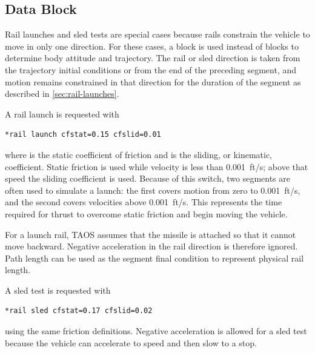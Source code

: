 \subsection{ Data Block}\label{sec:block-rail}

Rail launches and sled tests are special cases because rails constrain the vehicle to
move in only one direction. For these cases, a  block is used
instead of  blocks to determine body attitude and trajectory.
The rail or sled direction is taken from the trajectory initial conditions or from the
end of the preceding segment, and motion remains constrained in that direction for
the duration of the segment as described in \cref{sec:rail-launches}.

A rail launch is requested with

\begin{lstlisting}[style=taosmanual]
*rail launch cfstat=0.15 cfslid=0.01
\end{lstlisting}

where  is the static coefficient of friction and
 is the sliding, or kinematic, coefficient. Static friction is used
while velocity is less than 0.001~ft/s; above that speed the sliding coefficient is
used. Because of this switch, two segments are often used to simulate a launch: the
first covers motion from zero to 0.001~ft/s, and the second covers velocities above
0.001~ft/s. This represents the time required for thrust to overcome static friction
and begin moving the vehicle.

For a launch rail, TAOS assumes that the missile is attached so that it cannot move
backward. Negative acceleration in the rail direction is therefore ignored. Path length
 can be used as the segment final condition to represent physical
rail length.

A sled test is requested with

\begin{lstlisting}[style=taosmanual]
*rail sled cfstat=0.17 cfslid=0.02
\end{lstlisting}

using the same friction definitions. Negative acceleration is allowed for a sled test
because the vehicle can accelerate to speed and then slow to a stop.
